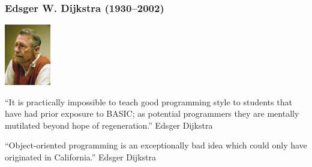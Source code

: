 \documentclass{beamer}
\newcounter{exo}
\newcommand{\exo}{
  \addtocounter{exo}{1}
  Exercice \arabic{exo}
}
\begin{document}

\ifanswers


\fi

\begin{frame}%
\frametitle{Edsger W. Dijkstra (1930--2002)}


\begin{center}
\includegraphics[width=2cm]{dijkstra.jpg}
\end{center}

\scriptsize

\begin{mdframed}[style=exampledefault]
``It is practically impossible to teach good programming style to students that have had prior exposure to BASIC; as potential programmers they are mentally mutilated beyond hope of regeneration.'' Edsger Dijkstra
\end{mdframed}

\vspace{0.4cm}

\begin{mdframed}[style=exampledefault]
``Object-oriented programming is an exceptionally bad idea which could only have originated in California.'' Edsger Dijkstra
\end{mdframed}

\end{frame}
\end{document}

